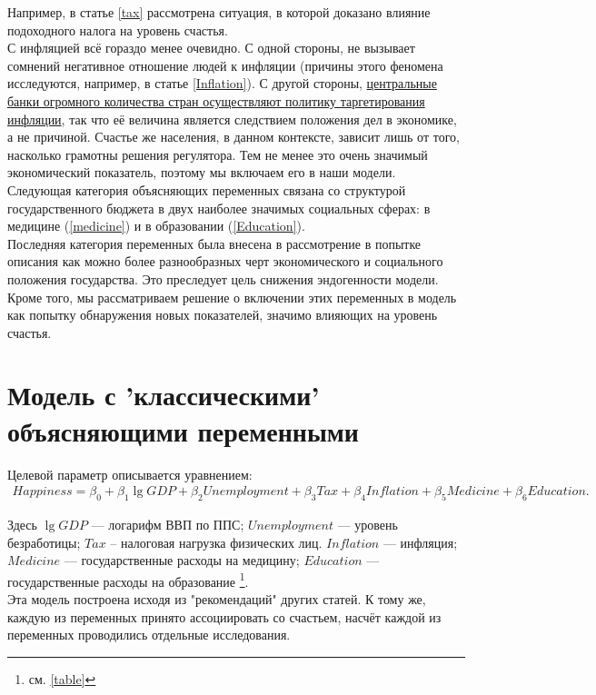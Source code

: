 \documentclass[russian]{vegareport}
\begin{document}
        Например, в статье \ref{tax} рассмотрена ситуация, в которой доказано влияние подоходного налога на уровень счастья.
        \\
        С инфляцией всё гораздо менее очевидно. С одной стороны, не вызывает сомнений негативное отношение людей к инфляции 
        (причины этого феномена исследуются, например, в статье \ref{Inflation}). С другой стороны, 
        \href{http://www.centralbanknews.info/p/inflation-targets.html}{центральные банки огромного количества стран осуществляют политику таргетирования инфляции}, 
        так что её величина является следствием положения дел в экономике, а не причиной. 
        Счастье же населения, в данном контексте, зависит лишь от того, насколько грамотны решения регулятора. 
        Тем не менее это очень значимый экономический показатель, поэтому мы включаем его в наши модели.
        \\
        Следующая категория объясняющих переменных связана со структурой государственного бюджета 
        в двух наиболее значимых социальных сферах: в медицине (\ref{medicine}) и в образовании (\ref{Education}).
        \\
        Последняя категория переменных была внесена в рассмотрение в попытке описания как можно 
        более разнообразных черт экономического и социального положения государства. 
        Это преследует цель снижения эндогенности модели. Кроме того, мы рассматриваем решение о 
        включении этих переменных в модель как попытку обнаружения новых показателей, значимо влияющих на уровень счастья.

        \section{Модель с 'классическими' объясняющими переменными}
        Целевой параметр описывается уравнением:
        \begin{align*}
        Happiness = \beta_0 + \beta_1 \lg{GDP} + \beta_2 Unemployment + \beta_3 Tax + \beta_4 Inflation + \beta_5 Medicine + \beta_6 Education.
        \end{align*}

        Здесь $\lg{GDP}$ --- логарифм ВВП по ППС; $Unemployment$ --- уровень безработицы; 
        $Tax$ -- налоговая нагрузка физических лиц. $Inflation$ --- инфляция; 
        $Medicine$ --- государственные расходы на медицину; 
        $Education$ --- государственные расходы на образование \footnote{см. \ref{table}}.
        \\
        Эта модель построена исходя из "рекомендаций" других статей. К тому же, каждую из переменных принято ассоциировать 
        со счастьем, насчёт каждой из переменных проводились отдельные исследования.
\end{document}
